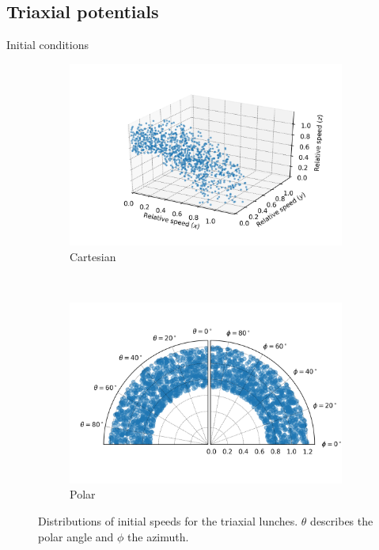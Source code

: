 \documentclass{beamer}
\begin{document}
\subsection{Triaxial potentials}
\begin{frame}{Initial conditions}
	\begin{figure}[h]
		\centering
		\begin{subfigure}[b]{0.475\textwidth}
			\includegraphics[width = \textwidth]{"../Files/Week 13/3d_initial_speeds"}
			\caption{Cartesian}
		\end{subfigure}
		~ 
		\begin{subfigure}[b]{0.475\textwidth}
			\includegraphics[width=\textwidth]{"../Files/Week 13/polar_initial_speeds"}
			\caption{Polar}
		\end{subfigure}
		\caption{Distributions of initial speeds for the triaxial lunches. $\theta$ describes the polar angle and $\phi$ the azimuth.}
		\label{fig: initialSpeedDistributions}
	\end{figure}
\end{frame}
\end{document}
